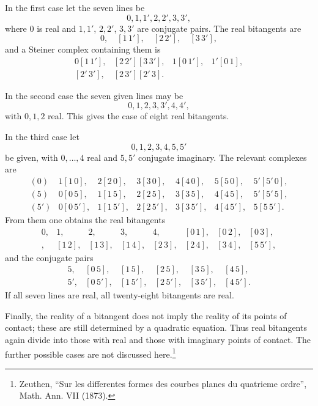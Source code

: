 \documentclass[11pt]{article}
\providecommand{\pair}[2]{[#1\,#2]}
\begin{document}
In the first case let the seven lines be
\[
 0,
 1,
 1',
 2,
 2',
 3,
 3',
\]
where \(0\) is real and \(1,1'\), \(2,2'\), \(3,3'\) are conjugate pairs. The real bitangents are
\[
0,\quad \pair{1}{1'},\quad \pair{2}{2'},\quad \pair{3}{3'},
\]
and a Steiner complex containing them is
\[
\begin{array}{llll}
0\pair{1}{1'},&\pair{2}{2'}\pair{3}{3'},&1\pair{0}{1'},&1'\pair{0}{1},\\
\pair{2}{3}\pair{2'}{3'},&\pair{2}{3'}\pair{2'}{3}.&&
\end{array}
\]

In the second case the seven given lines may be
\[
0,1,2,3,3',4,4',
\]
with \(0,1,2\) real. This gives the case of eight real bitangents.

In the third case let
\[
0,1,2,3,4,5,5'
\]
be given, with \(0,
\ldots,4\) real and \(5,5'\) conjugate imaginary. The relevant complexes are
\[
\begin{array}{rllllll}
(0)&1\pair{1}{0},&2\pair{2}{0},&3\pair{3}{0},&4\pair{4}{0},&5\pair{5}{0},&5'\pair{5'}{0},\\
(5)&0\pair{0}{5},&1\pair{1}{5},&2\pair{2}{5},&3\pair{3}{5},&4\pair{4}{5},&5'\pair{5'}{5},\\
(5')&0\pair{0}{5'},&1\pair{1}{5'},&2\pair{2}{5'},&3\pair{3}{5'},&4\pair{4}{5'},&5\pair{5}{5'}.
\end{array}
\]
From them one obtains the real bitangents
\[
\begin{array}{llllllll}
0,&1,&2,&3,&4,&\pair{0}{1},&\pair{0}{2},&\pair{0}{3},\\
\pair{0}{4},&\pair{1}{2},&\pair{1}{3},&\pair{1}{4},&\pair{2}{3},&\pair{2}{4},&\pair{3}{4},&\pair{5}{5'},
\end{array}
\]
and the conjugate pairs
\[
\begin{array}{llllll}
5,&\pair{0}{5},&\pair{1}{5},&\pair{2}{5},&\pair{3}{5},&\pair{4}{5},\\
5',&\pair{0}{5'},&\pair{1}{5'},&\pair{2}{5'},&\pair{3}{5'},&\pair{4}{5'}.
\end{array}
\]
If all seven lines are real, all twenty-eight bitangents are real.

Finally, the reality of a bitangent does not imply the reality of its points of contact; these are still determined by a quadratic equation. Thus real bitangents again divide into those with real and those with imaginary points of contact. The further possible cases are not discussed here.\footnote{Zeuthen, ``Sur les differentes formes des courbes planes du quatrieme ordre'', Math. Ann. VII (1873).}
\end{document}
